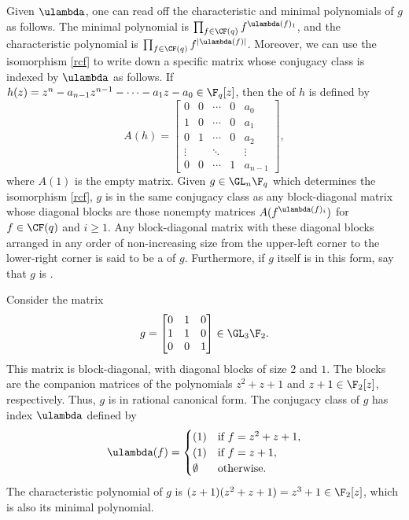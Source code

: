 Given $\ulambda$, one can read off the characteristic and minimal polynomials of $g$ as follows.
The minimal polynomial is
$\prod_{f \in \CF (q)} f^{\ulambda(f)_1}$,
and the characteristic polynomial is
$\prod_{f \in \CF (q)} f^{|\ulambda (f) |}$.
Moreover, we can use the isomorphism \eqref{rcf} to write down a specific matrix whose conjugacy class is indexed by $\ulambda$ as follows.
If $h(z) = z^n - a_{n-1}z^{n-1} - \cdots - a_1 z - a_0 \in \F_q[z]$, then the  of $h$ is defined by
$$
A(h) = \begin{bmatrix}
0 & 0 & \cdots & 0 & a_0    \\
1 & 0 & \cdots & 0 & a_1    \\
0 & 1 & \cdots & 0 & a_2    \\
\vdots  &   & \ddots &   & \vdots \\
0 & 0 & \cdots & 1 & a_{n-1}
\end{bmatrix},
$$
where $A(1)$ is the empty matrix.
Given $g \in \GL_n \F_q$ which determines the isomorphism \eqref{rcf}, $g$ is in the same conjugacy class as any block-diagonal matrix
whose diagonal blocks are those nonempty matrices $A(f^{\ulambda(f)_i})$ for $f \in \CF (q)$ and $i \geq 1$.
Any block-diagonal matrix with these diagonal blocks arranged in any order of non-increasing size from the upper-left corner to the lower-right corner is said to be a  of $g$.
Furthermore, if $g$ itself is in this form, say that $g$ is .

\begin{example}
Consider the matrix
$$ g = \begin{bmatrix}
0 & 1 & 0 \\
1 & 1 & 0 \\
0 & 0 & 1
\end{bmatrix} \in \GL_3 \F_2. $$
This matrix is block-diagonal, with diagonal blocks of size $2$ and $1$. The blocks are the companion matrices of the polynomials $z^2+z+1$ and $z+1 \in \F_2[z]$, respectively.
Thus, $g$ is in rational canonical form. The conjugacy class of $g$ has index $\ulambda$ defined by
$$ \ulambda (f) = \begin{cases}
(1) & \text{if } f = z^2 + z + 1, \\
(1) & \text{if } f = z+1, \\
\emptyset & \text{otherwise.}
\end{cases} $$
The characteristic polynomial of $g$ is $(z+1)(z^2+z+1) = z^3+1 \in \F_2 [z]$, which is also its minimal polynomial.
\end{example}



